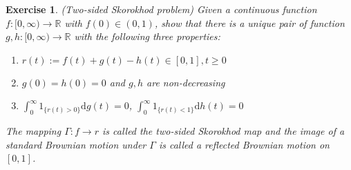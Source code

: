 \documentclass[12pt]{article}
\theoremstyle{colon}
\newtheorem{exercise}{Exercise}
\begin{document}
\begin{exercise}
  (Two-sided Skorokhod problem) Given a continuous function $f : [0,\infty) \rightarrow \mathbb{R}$ with $f(0) \in (0,1)$, show that there is a unique pair of function $g,h : [0,\infty) \rightarrow \mathbb{R}$ with the following three properties:
  \begin{enumerate}[label=\roman*)]
    \item $r(t) := f(t) + g(t) - h(t) \in [0,1], t \geq 0$
    \item $g(0) = h(0) = 0$ and $g, h$ are non-decreasing
    \item $\int_0^\infty 1_{\{r(t) > 0\}} \text{d}g(t) = 0$, $\int_0^\infty 1_{\{r(t) < 1\}} \text{d}h(t) = 0$
  \end{enumerate}
  The mapping $\Gamma : f \rightarrow r$ is called the \textit{two-sided Skorokhod map} and the image of a standard Brownian motion under $\Gamma$ is called a \textit{reflected Brownian motion on} $[0,1]$.
\end{exercise}
\end{document}
